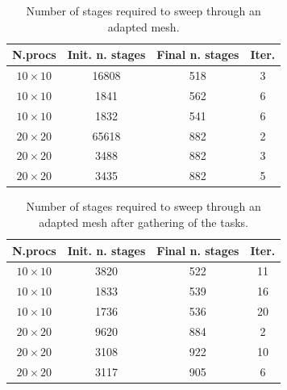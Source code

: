 \documentclass[letterpaper]{article}
\renewcommand{\(}{\left(}
\renewcommand{\)}{\right)}
\renewcommand{\[}{\left[}
\renewcommand{\]}{\right]}
\begin{document}

\begin{table}[H]
  \begin{center}
    \begin{tabular}{|c|c|c|c|}
      \hline
      N.procs & Init. n. stages & Final n. stages & Iter. \\
      \hline
      $10 \times 10$ & 16808 & 518 & 3 \\
      $10 \times 10$ &  1841 & 562 & 6 \\
      $10 \times 10$ &  1832 & 541 & 6 \\
      $20 \times 20$ & 65618 & 882 & 2 \\
      $20 \times 20$ &  3488 & 882 & 3 \\
      $20 \times 20$ &  3435 & 882 & 5 \\
      \hline
    \end{tabular}
    \caption{Number of stages required to sweep through an adapted mesh.}
    \label{band_1}
  \end{center}
\end{table}

\begin{table}[H]
  \begin{center}
    \begin{tabular}{|c|c|c|c|}
      \hline
      N.procs & Init. n. stages & Final n. stages & Iter. \\
      \hline
      $10 \times 10$ & 3820 & 522 & 11 \\
      $10 \times 10$ & 1833 & 539 & 16 \\
      $10 \times 10$ & 1736 & 536 & 20 \\
      $20 \times 20$ & 9620 & 884 & 2  \\
      $20 \times 20$ & 3108 & 922 & 10 \\
      $20 \times 20$ & 3117 & 905 & 6  \\
      \hline
    \end{tabular}
    \caption{Number of stages required to sweep through an adapted mesh after
    gathering of the tasks.}
    \label{band_2}
  \end{center}
\end{table}
\end{document}
